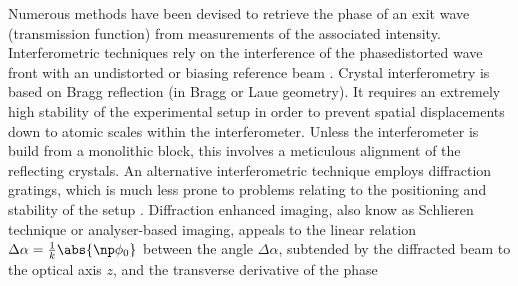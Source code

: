 \documentclass[
twoside,
openright,
titlepage,
numbers=noenddot,
headinclude,
fleqn,
a4paper,
footinclude=true,
cleardoublepage=empty,
abstractoff,
BCOR=5mm,
paper=a4,
fontsize=11pt,
british,ngerman,american,
]{scrreprt}
\begin{document}
Numerous methods have been devised to retrieve the phase of an exit
wave (transmission function) from measurements of the associated
intensity.  Interferometric techniques rely on the interference of the
phase\hyph distorted wave front with an undistorted or biasing
reference beam \cite{Zernike1942a, Zernike1942b, BonseHart1965,
  Momose1995nima, BornWolf}.  Crystal interferometry \eg{} is based on
Bragg reflection (in Bragg or Laue geometry).  It requires an
extremely high stability of the experimental setup in order to prevent
spatial displacements down to atomic scales within the interferometer.
Unless the interferometer is build from a monolithic block, this
involves a meticulous alignment of the reflecting crystals.  An
alternative interferometric technique employs diffraction gratings,
which is much less prone to problems relating to the positioning and
stability of the setup \cite{Platt2001, David2002, Kohmura2003,
  Momose2003opex, Pfeiffer2006natphys}.  Diffraction enhanced imaging,
also know as Schlieren technique or analyser-based imaging, appeals to
the linear relation $\Delta \alpha = \frac{1}{k}\abs{\np\phi_0}$
between the angle $\Delta\alpha$, subtended by the diffracted beam to
the optical axis $z$, and the transverse derivative of the phase
\end{document}
